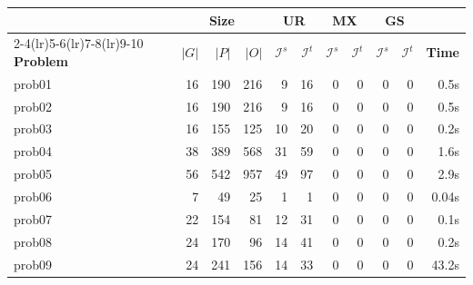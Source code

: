 \begin{table}[ht]
    \centering
    \small
    \begin{tabular}{lrrr rr rr rr r}
        \toprule
                         & \multicolumn{3}{c}{\textbf{Size}}
                         & \multicolumn{2}{c}{\textbf{UR}}
                         & \multicolumn{2}{c}{\textbf{MX}}
                         & \multicolumn{2}{c}{\textbf{GS}}   &                                                             \\
        \cmidrule(lr){2-4}\cmidrule(lr){5-6}\cmidrule(lr){7-8}\cmidrule(lr){9-10}
        \textbf{Problem} & $|G|$                             & $|P|$           & $|O|$
                         & $\mathcal{I}^s$                   & $\mathcal{I}^t$
                         & $\mathcal{I}^s$                   & $\mathcal{I}^t$
                         & $\mathcal{I}^s$                   & $\mathcal{I}^t$
                         & \textbf{Time}                                                                                   \\
        \midrule
        prob01           & 16                                & 190             & 216   & 9  & 16 & 0 & 0  & 0 & 0  & 0.5s  \\
        prob02           & 16                                & 190             & 216   & 9  & 16 & 0 & 0  & 0 & 0  & 0.5s  \\
        prob03           & 16                                & 155             & 125   & 10 & 20 & 0 & 0  & 0 & 0  & 0.2s  \\
        prob04           & 38                                & 389             & 568   & 31 & 59 & 0 & 0  & 0 & 0  & 1.6s  \\
        prob05           & 56                                & 542             & 957   & 49 & 97 & 0 & 0  & 0 & 0  & 2.9s  \\
        prob06           & 7                                 & 49              & 25    & 1  & 1  & 0 & 0  & 0 & 0  & 0.04s \\
        prob07           & 22                                & 154             & 81    & 12 & 31 & 0 & 0  & 0 & 0  & 0.1s  \\
        prob08           & 24                                & 170             & 96    & 14 & 41 & 0 & 0  & 0 & 0  & 0.2s  \\
        prob09           & 24                                & 241             & 156   & 14 & 33 & 0 & 0  & 0 & 0  & 43.2s \\

\end{tabular}
\end{table}
